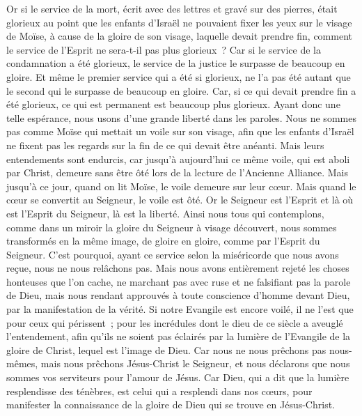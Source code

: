 \begin{multicols}{2}
Or si le service de la mort, écrit avec des lettres et gravé sur des pierres, était glorieux au point que les enfants d'Israël ne pouvaient fixer les yeux sur le visage de Moïse, à cause de la gloire de son visage, laquelle devait prendre fin,
comment le service de l'Esprit ne sera-t-il pas plus glorieux~?
Car si le service de la condamnation a été glorieux, le service de la justice le surpasse de beaucoup en gloire.
Et même le premier service qui a été si glorieux, ne l'a pas été autant que le second qui le surpasse de beaucoup en gloire.
Car, si ce qui devait prendre fin a été glorieux, ce qui est permanent est beaucoup plus glorieux.
Ayant donc une telle espérance, nous usons d'une grande liberté dans les paroles.
Nous ne sommes pas comme Moïse qui mettait un voile sur son visage, afin que les enfants d'Israël ne fixent pas les regards sur la fin de ce qui devait être anéanti.
Mais leurs entendements sont endurcis, car jusqu'à aujourd'hui ce même voile, qui est aboli par Christ, demeure sans être ôté lors de la lecture de l'Ancienne Alliance.
Mais jusqu'à ce jour, quand on lit Moïse, le voile demeure sur leur cœur.
Mais quand le cœur se convertit au Seigneur, le voile est ôté.
Or le Seigneur est l'Esprit et là où est l'Esprit du Seigneur, là est la liberté.
Ainsi nous tous qui contemplons, comme dans un miroir la gloire du Seigneur à visage découvert, nous sommes transformés en la même image, de gloire en gloire, comme par l'Esprit du Seigneur.
\VerseOne{}C'est pourquoi, ayant ce service selon la miséricorde que nous avons reçue, nous ne nous relâchons pas.
Mais nous avons entièrement rejeté les choses honteuses que l'on cache, ne marchant pas avec ruse et ne falsifiant pas la parole de Dieu, mais nous rendant approuvés à toute conscience d'homme devant Dieu, par la manifestation de la vérité.
Si notre Evangile est encore voilé, il ne l'est que pour ceux qui périssent~;
pour les incrédules dont le dieu de ce siècle a aveuglé l'entendement, afin qu'ils ne soient pas éclairés par la lumière de l'Evangile de la gloire de Christ, lequel est l'image de Dieu.
Car nous ne nous prêchons pas nous-mêmes, mais nous prêchons Jésus-Christ le Seigneur, et nous déclarons que nous sommes vos serviteurs pour l'amour de Jésus.
Car Dieu, qui a dit que la lumière resplendisse des ténèbres, est celui qui a resplendi dans nos cœurs, pour manifester la connaissance de la gloire de Dieu qui se trouve en Jésus-Christ.

\end{multicols}
